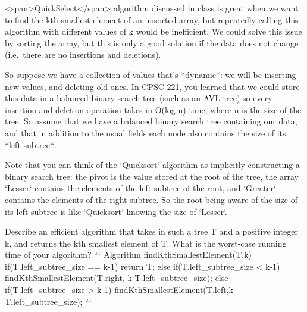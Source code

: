 <span>QuickSelect</span> algorithm discussed in class is great when we
want to find the kth smallest element of an
unsorted array, but repeatedly calling this algorithm with different
values of k would be inefficient. We could solve this issue by sorting
the array, but this is only a good solution if the data does not change
(i.e. there are no insertions and deletions).

So suppose we have a collection of values that’s *dynamic*: we will be
inserting new values, and deleting old ones. In CPSC 221, you learned
that we could store this data in a balanced binary search tree (such as
an AVL tree) so every insertion and deletion operation takes in
O(log n) time, where n is the size of the tree. So assume that we
have a balanced binary search tree containing our data, and that in
addition to the usual fields each node also contains the size of its
*left subtree*.

Note that you can think of the `Quicksort` algorithm as implicitly
constructing a binary search tree: the pivot is the value stored at the
root of the tree, the array `Lesser` contains the elements of the left
subtree of the root, and `Greater` contains the elements of the right
subtree. So the root being aware of the size of its left subtree is like
`Quicksort` knowing the size of `Lesser`.

Describe an efficient algorithm that takes in such a tree T and a
positive integer k, and returns the kth
smallest element of T. What is the worst-case running time of your
algorithm?
```
Algorithm findKthSmallestElement(T,k){
    if(T.left_subtree_size == k-1){
        return T;
    }
    else{
        if(T.left_subtree_size < k-1){
            findKthSmallestElement(T.right, k-T.left_subtree_size);
        }
        else{
            if(T.left_subtree_size > k-1){
                findKthSmallestElement(T.left,k-T.left_subtree_size);
            }
        }
    }
}
```
